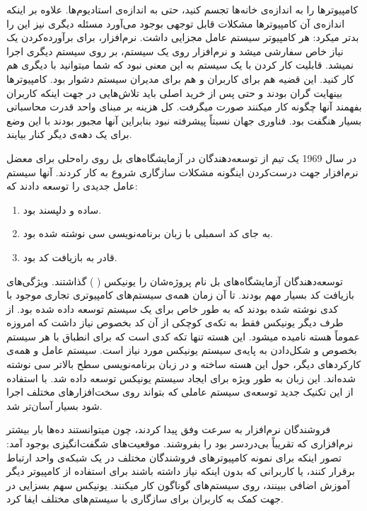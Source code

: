 کامپیوترها را به اندازه‌ی خانه‌ها تجسم کنید، حتی به اندازه‌ی استادیوم‌ها. علاوه بر اینکه اندازه‌ی آن کامپیوترها مشکلات قابل توجهی بوجود می‌آورد مسئله‌ دیگری نیز این را بدتر میکرد: هر کامپیوتر سیستم عامل مجزایی داشت. نرم‌افزار، برای برآورده‌کردن یک نیاز خاص سفارشی میشد و نرم‌افزار روی یک سیستم، بر روی سیستم دیگری اجرا نمیشد. قابلیت کار کردن با یک سیستم به این معنی نبود که شما میتوانید با دیگری هم کار کنید. این قضیه هم برای کاربران و هم برای مدیران سیستم دشوار بود.
کامپیوترها بینهایت گران بودند و حتی پس از خرید اصلی باید تلاش‌هایی در جهت اینکه کاربران بفهمند آنها چگونه کار میکنند صورت میگرفت. کل هزینه‌ بر مبنای واحد قدرت محاسباتی بسیار هنگفت بود.
فناوری جهان نسبتاً پیشرفته نبود بنابراین آنها مجبور بودند با این وضع برای یک دهه‌ی دیگر کنار بیایند.

در سال 1969 یک تیم از توسعه‌دهندگان در آزمایشگاه‌های بل روی راه‌حلی برای معضل نرم‌افزار جهت درست‌کردن اینگونه مشکلات سازگاری شروع به کار کردند. آنها سیستم عامل جدیدی را توسعه دادند که:
\begin{enumerate}
	\item ساده و دلپسند بود.
	\item به جای کد اسمبلی با زبان برنامه‌نویسی سی نوشته شده بود.
	\item  قادر به بازیافت کد بود.
\end{enumerate}

توسعه‌دهندگان آزمایشگاه‌های بل نام پروژه‌شان را یونیکس (
) گذاشتند.
ویژگی‌های بازیافت کد بسیار مهم بودند. تا آن زمان همه‌ی سیستم‌های کامپیوتری تجاری موجود با کدی نوشته شده بودند که به طور خاص برای یک سیستم توسعه داده شده بود. از طرف دیگر یونیکس فقط به تکه‌ی کوچکی از آن کد بخصوص نیاز داشت که امروزه عموماً هسته نامیده میشود. این هسته تنها تکه کدی است که برای انطباق با هر سیستم بخصوص و شکل‌دادن به پایه‌ی سیستم یونیکس مورد نیاز است. سیستم عامل و همه‌ی کارکردهای دیگر، حول این هسته ساخته و در زبان برنامه‌نویسی سطح بالاتر سی نوشته شده‌اند. این زبان به طور ویژه برای ایجاد سیستم یونیکس توسعه داده شد. با استفاده از این تکنیک جدید توسعه‌ی سیستم عاملی که بتواند روی سخت‌افزارهای مختلف اجرا شود بسیار آسان‌تر شد.

فروشندگان نرم‌افزار به سرعت وفق پیدا کردند، چون میتوانستند ده‌ها بار بیشتر نرم‌افزاری که تقریباً بی‌دردسر بود را بفروشند. موقعیت‌های شگفت‌انگیزی بوجود آمد: تصور اینکه برای نمونه کامپیوترهای فروشندگان مختلف در یک شبکه‌ی واحد ارتباط برقرار کنند، یا کاربرانی که بدون اینکه نیاز داشته باشند برای استفاده از کامپیوتر دیگر آموزش اضافی ببینند، روی سیستم‌های گوناگون کار میکنند. یونیکس سهم بسزایی در جهت کمک به کاربران برای سازگاری با سیستم‌های مختلف ایفا کرد.

